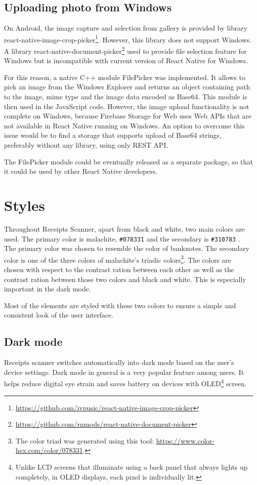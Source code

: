 \documentclass[
  digital, %
  table,   %
  oneside, %
  lof,     %
  lot,     %
]{fithesis3}
\makeatletter
\def\testclr#1#{\@testclr{#1}}
\def\@testclr#1#2{{\fboxsep\z@\fbox{\colorbox#1{#2}{\phantom{XX}}}}}
\makeatother
\begin{document}
\subsection{Uploading photo from Windows}
On Android, the image capture and selection from gallery is provided by library react-native-image-crop-picker\footnote{\url{https://github.com/ivpusic/react-native-image-crop-picker}}. However, this library does not support Windows. A library react-native-document-picker\footnote{\url{https://github.com/rnmods/react-native-document-picker}} used to provide file selection feature for Windows but is incompatible with current version of React Native for Windows. 

For this reason, a native C++ module FilePicker was implemented. It allows to pick an image from the Windows Explorer and returns an object containing path to the image, mime type and the image data encoded as Base64. This module is then used in the JavaScript code. However, the image upload functionality is not complete on Windows, because Firebase Storage for Web uses Web APIs that are not available in React Native running on Windows. An option to overcome this issue would be to find a storage that supports upload of Base64 strings, preferably without any library, using only REST API.

The FilePicker module could be eventually released as a separate package, so that it could be used by other React Native developers.

\section{Styles}
Throughout Receipts Scanner, apart from black and white, two main colors are used. The primary color is malachite, \texttt{\#078331}  and the secondary is \texttt{\#310783} . The primary color was chosen to resemble the color of banknotes. The secondary color is one of the three colors of malachite's triadic colors\footnote{The color triad was generated using this tool: \url{https://www.color-hex.com/color/078331}.}. 
The colors are chosen with respect to the contrast ration between each other as well as the contrast ration between those two colors and black and white. This is especially important in the dark mode.

Most of the elements are styled with these two colors to ensure a simple and consistent look of the user interface. 

\subsection{Dark mode}
Receipts scanner switches automatically into dark mode based on the user's device settings. Dark mode in general is a very popular feature among users. It helps reduce digital eye strain and saves battery on devices with OLED\footnote{Unlike LCD screens that illuminate using a back panel that always lights up completely, in OLED displays, each pixel is individually lit.} screen.
\end{document}
